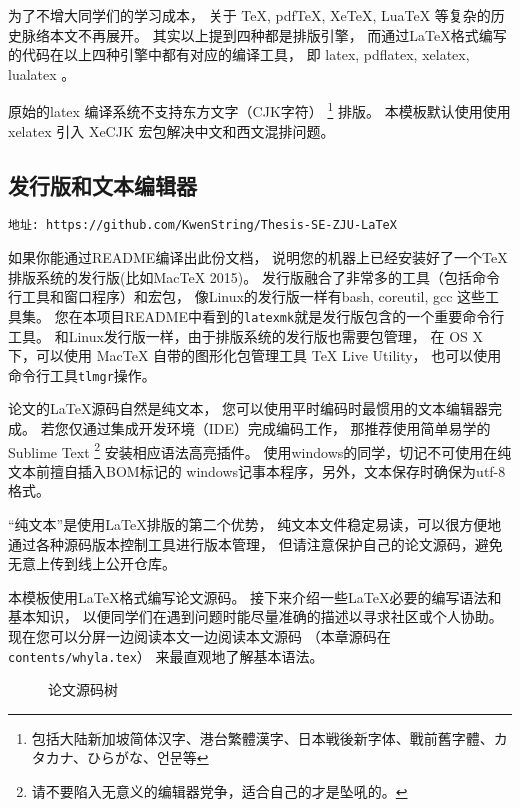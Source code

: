 为了不增大同学们的学习成本，
关于 TeX, pdfTeX,  XeTeX,  LuaTeX 等复杂的历史脉络本文不再展开。
其实以上提到四种都是排版引擎，
而通过\LaTeX 格式编写的代码在以上四种引擎中都有对应的编译工具，
即 latex, pdflatex, xelatex, lualatex 。

原始的latex 编译系统不支持东方文字（CJK字符）
\footnote{包括大陆新加坡简体汉字、港台繁體漢字、日本戦後新字体、戰前舊字體、カタカナ、ひらがな、언문等}
排版。
本模板默认使用使用 xelatex 引入 XeCJK 宏包解决中文和西文混排问题。

\subsection{发行版和文本编辑器}
\begin{verbatim}
地址: https://github.com/KwenString/Thesis-SE-ZJU-LaTeX
\end{verbatim}
如果你能通过README编译出此份文档，
说明您的机器上已经安装好了一个\TeX 排版系统的发行版(比如MacTeX 2015)。
发行版融合了非常多的工具（包括命令行工具和窗口程序）和宏包，
像Linux的发行版一样有bash, coreutil, gcc 这些工具集。
您在本项目README中看到的\texttt{latexmk}就是发行版包含的一个重要命令行工具。
和Linux发行版一样，由于排版系统的发行版也需要包管理，
在 OS X 下，可以使用 MacTeX 自带的图形化包管理工具 TeX Live Utility，
也可以使用命令行工具\texttt{tlmgr}操作。

论文的\LaTeX 源码自然是纯文本，
您可以使用平时编码时最惯用的文本编辑器完成。
若您仅通过集成开发环境（IDE）完成编码工作，
那推荐使用简单易学的Sublime Text
\footnote{请不要陷入无意义的编辑器党争，适合自己的才是坠吼的。}
安装相应语法高亮插件。
使用windows的同学，切记不可使用在纯文本前擅自插入BOM标记的
windows记事本程序，另外，文本保存时确保为utf-8格式。

“纯文本”是使用\LaTeX 排版的第二个优势，
纯文本文件稳定易读，可以很方便地通过各种源码版本控制工具进行版本管理，
但请注意保护自己的论文源码，避免无意上传到线上公开仓库。

本模板使用\LaTeX 格式编写论文源码。
\label{dirtree}
接下来介绍一些\LaTeX 必要的编写语法和基本知识，
以便同学们在遇到问题时能尽量准确的描述以寻求社区或个人协助。
现在您可以分屏一边阅读本文一边阅读本文源码
（本章源码在\texttt{contents/whyla.tex}）
来最直观地了解基本语法。

\begin{figure}[htbp]
    \centering
    \caption{论文源码树}
\end{figure}

